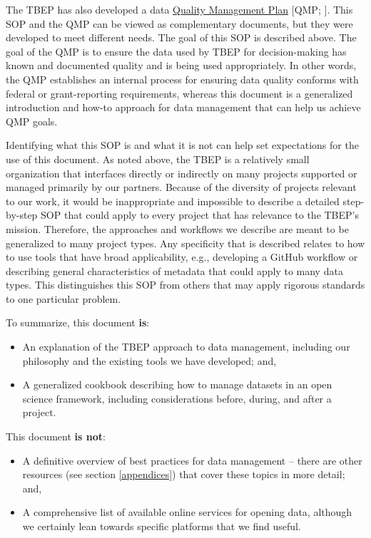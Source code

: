 \documentclass[
]{book}
\providecommand{\tightlist}{%
  \setlength{\itemsep}{0pt}\setlength{\parskip}{0pt}}
\begin{document}
The TBEP has also developed a data \href{https://drive.google.com/file/d/1DyA0PNHV8rEXGMwGiyS7sXY1ECLYpJJO/view}{Quality Management Plan} {[}QMP; \citet{tbep1620}{]}. This SOP and the QMP can be viewed as complementary documents, but they were developed to meet different needs. The goal of this SOP is described above. The goal of the QMP is to ensure the data used by TBEP for decision-making has known and documented quality and is being used appropriately. In other words, the QMP establishes an internal process for ensuring data quality conforms with federal or grant-reporting requirements, whereas this document is a generalized introduction and how-to approach for data management that can help us achieve QMP goals.

Identifying what this SOP is and what it is not can help set expectations for the use of this document. As noted above, the TBEP is a relatively small organization that interfaces directly or indirectly on many projects supported or managed primarily by our partners. Because of the diversity of projects relevant to our work, it would be inappropriate and impossible to describe a detailed step-by-step SOP that could apply to every project that has relevance to the TBEP's mission. Therefore, the approaches and workflows we describe are meant to be generalized to many project types. Any specificity that is described relates to how to use tools that have broad applicability, e.g., developing a GitHub workflow or describing general characteristics of metadata that could apply to many data types. This distinguishes this SOP from others that may apply rigorous standards to one particular problem.

To summarize, this document \textbf{is}:

\begin{itemize}
\tightlist
\item
  An explanation of the TBEP approach to data management, including our philosophy and the existing tools we have developed; and,
\item
  A generalized cookbook describing how to manage datasets in an open science framework, including considerations before, during, and after a project.
\end{itemize}

This document \textbf{is not}:

\begin{itemize}
\tightlist
\item
  A definitive overview of best practices for data management -- there are other resources (see section \ref{appendices}) that cover these topics in more detail; and,
\item
  A comprehensive list of available online services for opening data, although we certainly lean towards specific platforms that we find useful.
\end{itemize}
\end{document}
